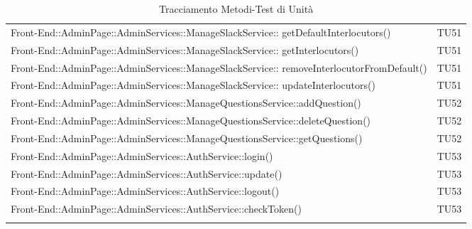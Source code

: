 \documentclass[../PianoDiQualifica_v3.0.0.tex]{subfiles}
\begin{document}
\begin{longtable}[c] {>{\centering\arraybackslash}p{} >{\centering\arraybackslash}p{}}
 			\addlinespace[0.3em]
			\midrule
			\addlinespace[0.3em]
			Front-End::AdminPage::AdminServices::ManageSlackService:: getDefaultInterlocutors() & TU51 \\
			\addlinespace[0.3em]
			\midrule
			\addlinespace[0.3em]
			Front-End::AdminPage::AdminServices::ManageSlackService:: getInterlocutors() & TU51 \\
			\addlinespace[0.3em]
			\midrule
			\addlinespace[0.3em]
			Front-End::AdminPage::AdminServices::ManageSlackService:: removeInterlocutorFromDefault() & TU51 \\
			\addlinespace[0.3em]
			\midrule
			\addlinespace[0.3em]
			Front-End::AdminPage::AdminServices::ManageSlackService:: updateInterlocutors() & TU51 \\
			\addlinespace[0.3em]
			\midrule
			\addlinespace[0.3em]
			Front-End::AdminPage::AdminServices::ManageQuestionsService::addQuestion() & TU52 \\
			\addlinespace[0.3em]
			\midrule
			\addlinespace[0.3em]
			Front-End::AdminPage::AdminServices::ManageQuestionsService::deleteQuestion() & TU52 \\
			\addlinespace[0.3em]
			\midrule
			\addlinespace[0.3em]
			Front-End::AdminPage::AdminServices::ManageQuestionsService::getQuestions() & TU52 \\
			\addlinespace[0.3em]
			\midrule
			\addlinespace[0.3em]
			Front-End::AdminPage::AdminServices::AuthService::login() & TU53 \\
			\addlinespace[0.3em]
			\midrule
			\addlinespace[0.3em]
			Front-End::AdminPage::AdminServices::AuthService::update() & TU53 \\
			\addlinespace[0.3em]
			\midrule
			\addlinespace[0.3em]
 			Front-End::AdminPage::AdminServices::AuthService::logout() & TU53 \\
 			\addlinespace[0.3em]
			\midrule
			\addlinespace[0.3em]
 			Front-End::AdminPage::AdminServices::AuthService::checkToken() & TU53 \\
 			\bottomrule
			\caption{Tracciamento Metodi-Test di Unità}
	\end{longtable}

	\newpage
\end{document}
